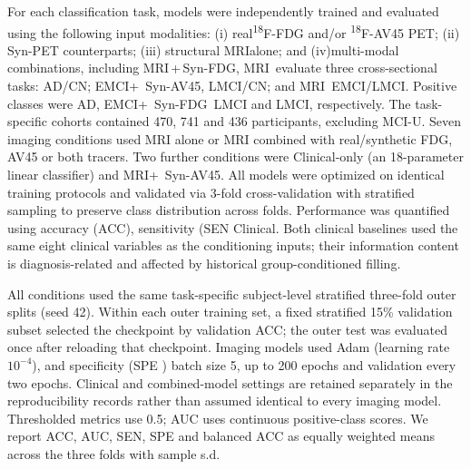 \documentclass{article}
\providecommand{\DIFaddtex}[1]{{\protect\color{blue} \sf #1}} %
\providecommand{\DIFdeltex}[1]{{\protect\color{red} \scriptsize #1}} %
\providecommand{\DIFaddbegin}{} %
\providecommand{\DIFaddend}{} %
\providecommand{\DIFdelbegin}{} %
\providecommand{\DIFdelend}{} %
\providecommand{\DIFadd}[1]{\texorpdfstring{\DIFaddtex{#1}}{#1}} %
\providecommand{\DIFdel}[1]{\texorpdfstring{\DIFdeltex{#1}}{}} %
\newcommand{\DIFscaledelfig}{0.5}
\newlength{\DIFdelgraphicswidth} %
\newlength{\DIFdelgraphicsheight} %
\newcommand{\DIFaddincludegraphics}[2][]{{\color{blue}\fbox{\DIFOincludegraphics[#1]{#2}}}} %
\newcommand{\DIFdelincludegraphics}[2][]{%
\sbox{\DIFdelgraphicsbox}{\DIFOincludegraphics[#1]{#2}}%
\settoboxwidth{\DIFdelgraphicswidth}{\DIFdelgraphicsbox} %
\settoboxtotalheight{\DIFdelgraphicsheight}{\DIFdelgraphicsbox} %
\scalebox{\DIFscaledelfig}{%
\parbox[b]{\DIFdelgraphicswidth}{\usebox{\DIFdelgraphicsbox}\\[-\baselineskip] \rule{\DIFdelgraphicswidth}{0em}}\llap{\resizebox{\DIFdelgraphicswidth}{\DIFdelgraphicsheight}{%
\setlength{\unitlength}{\DIFdelgraphicswidth}%
\begin{picture}(1,1)%
\thicklines\linethickness{2pt} %
{\color[rgb]{1,0,0}\put(0,0){\framebox(1,1){}}}%
{\color[rgb]{1,0,0}\put(0,0){\line( 1,1){1}}}%
{\color[rgb]{1,0,0}\put(0,1){\line(1,-1){1}}}%
\end{picture}%
}\hspace*{3pt}}} %
} %
\DeclareRobustCommand{\DIFaddbegin}{\DIFOaddbegin \let\includegraphics\DIFaddincludegraphics} %
\DeclareRobustCommand{\DIFaddend}{\DIFOaddend \let\includegraphics\DIFOincludegraphics} %
\DeclareRobustCommand{\DIFdelbegin}{\DIFOdelbegin \let\includegraphics\DIFdelincludegraphics} %
\DeclareRobustCommand{\DIFdelend}{\DIFOaddend \let\includegraphics\DIFOincludegraphics} %
\begin{document}
\DIFdel{For each classification task, models were independently trained and evaluated using the following input modalities: (i) real\textsuperscript{18}F-FDG and/or \textsuperscript{18}F-AV45 PET; (ii) Syn-PET counterparts; (iii) structural MRIalone; and (iv)multi-modal combinations, including MRI\,+\,Syn-FDG, MRI\,}\DIFdelend \DIFaddbegin \DIFadd{evaluate three cross-sectional tasks: AD/CN; EMCI}\DIFaddend +\DIFdelbegin \DIFdel{\,Syn-AV45, }\DIFdelend \DIFaddbegin \DIFadd{LMCI/CN; }\DIFaddend and \DIFdelbegin \DIFdel{MRI\,}\DIFdelend \DIFaddbegin \DIFadd{EMCI/LMCI. Positive classes were AD, EMCI}\DIFaddend +\DIFdelbegin \DIFdel{\,Syn-FDG\,}\DIFdelend \DIFaddbegin \DIFadd{LMCI and LMCI, respectively. The task-specific cohorts contained 470, 741 and 436 participants, excluding MCI-U. Seven imaging conditions used MRI alone or MRI combined with real/synthetic FDG, AV45 or both tracers. Two further conditions were Clinical-only (an 18-parameter linear classifier) and MRI}\DIFaddend +\DIFdelbegin \DIFdel{\,Syn-AV45. All models were optimized on identical training protocols and validated via 3-fold cross-validation with stratified sampling to preserve class distribution across folds. Performance was quantified using accuracy (ACC), sensitivity (SEN}\DIFdelend \DIFaddbegin \DIFadd{Clinical. Both clinical baselines used the same eight clinical variables as the conditioning inputs; their information content is diagnosis-related and affected by historical group-conditioned filling.
}

\DIFadd{All conditions used the same task-specific subject-level stratified three-fold outer splits (seed 42). Within each outer training set, a fixed stratified 15\% validation subset selected the checkpoint by validation ACC; the outer test was evaluated once after reloading that checkpoint. Imaging models used Adam (learning rate $10^{-4}$}\DIFaddend ), \DIFdelbegin \DIFdel{and specificity (SPE )}\DIFdelend \DIFaddbegin \DIFadd{batch size 5, up to 200 epochs and validation every two epochs. Clinical and combined-model settings are retained separately in the reproducibility records rather than assumed identical to every imaging model. Thresholded metrics use 0.5; AUC uses continuous positive-class scores. We report ACC, AUC, SEN, SPE and balanced ACC as equally weighted means across the three folds with sample s.d}\DIFaddend .
\end{document}
